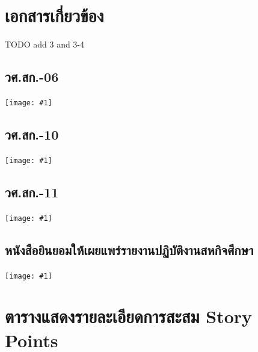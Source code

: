 \newcommand{\includepdfwithfirstpagefit}[1]{
    \texttt{[image: \#1]}
    
}

\newcommand{\includepdfwithonepage}[1]{
    \texttt{[image: \#1]}
}

\chapter{เอกสารเกี่ยวข้อง}

TODO add 3 and 3-4

\section{วศ.สก.-06}
\includepdfwithfirstpagefit{resources/bureaucrats/coop6.pdf}

\section{วศ.สก.-10}
\includepdfwithfirstpagefit{resources/bureaucrats/coop10.pdf}

\section{วศ.สก.-11}
\includepdfwithonepage{resources/bureaucrats/coop11.pdf}

\section{หนังสือยินยอมให้เผยแพร่รายงานปฏิบัติงานสหกิจศึกษา}
\includepdfwithonepage{resources/bureaucrats/publish-consent.pdf}

\chapter{ตารางแสดงรายละเอียดการสะสม Story Points}
